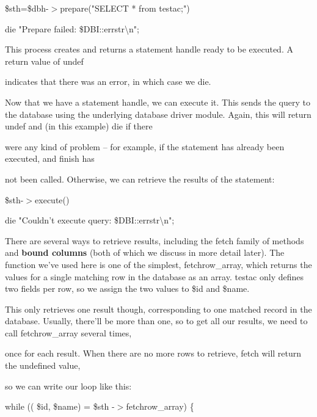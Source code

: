 \documentclass[a4paper,11pt]{book}
\begin{document}
\noindent 

\noindent \$sth=\$dbh-$>$prepare("SELECT * from testac;") \textbar \textbar 

\noindent die "Prepare failed: \$DBI::errstr\textbackslash n";

\noindent 

\noindent This process creates and returns a statement handle ready to be executed. A return value of undef

\noindent indicates that there was an error, in which case we die.

\noindent 

\noindent Now that we have a statement handle, we can execute it. This sends the query to the database using the underlying database driver module. Again, this will return undef and (in this example) die if there

\noindent were any kind of problem -- for example, if the statement has already been executed, and finish has

\noindent not been called. Otherwise, we can retrieve the results of the statement:

\noindent 

\noindent 

\noindent \$sth-$>$execute() \textbar \textbar 

\noindent die "Couldn't execute query: \$DBI::errstr\textbackslash n";

\noindent 

\noindent There are several ways to retrieve results, including the fetch family of methods and \textbf{bound columns }(both of which we discuss in more detail later). The function we've used here is one of the simplest, fetchrow\_array, which returns the values for a single matching row in the database as an array. testac only defines two fields per row, so we assign the two values to \$id and \$name.

\noindent 

\noindent This only retrieves one result though, corresponding to one matched record in the database. Usually, there'll be more than one, so to get all our results, we need to call fetchrow\_array several times,

\noindent once for each result. When there are no more rows to retrieve, fetch will return the undefined value,

\noindent so we can write our loop like this:

\noindent 

\noindent while (( \$id, \$name) = \$sth -$>$fetchrow\_array) \{
\end{document}
